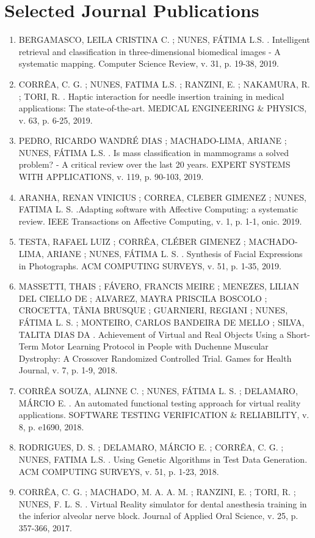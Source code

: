 \documentclass[11pt,a4paper,sans]{moderncv} %
\begin{document}
\section{Selected Journal Publications}
\footnotesize
\begin{enumerate}
    \item BERGAMASCO, LEILA CRISTINA C. ; NUNES, FÁTIMA L.S. . Intelligent retrieval and classification in three-dimensional biomedical images - A systematic mapping. Computer Science Review, v. 31, p. 19-38, 2019.
    \item CORRÊA, C. G. ; NUNES, FATIMA L.S. ; RANZINI, E. ; NAKAMURA, R. ; TORI, R. . Haptic interaction for needle insertion training in medical applications: The state-of-the-art. MEDICAL ENGINEERING \& PHYSICS, v. 63, p. 6-25, 2019.
    \item PEDRO, RICARDO WANDRÉ DIAS ; MACHADO-LIMA, ARIANE ; NUNES, FÁTIMA L.S. . Is mass classification in mammograms a solved problem? - A critical review over the last 20 years. EXPERT SYSTEMS WITH APPLICATIONS, v. 119, p. 90-103, 2019.
    \item ARANHA, RENAN VINICIUS ; CORREA, CLEBER GIMENEZ ; NUNES, FATIMA L. S. .Adapting software with Affective Computing: a systematic review. IEEE Transactions on Affective Computing, v. 1, p. 1-1, onic. 2019.
    \item TESTA, RAFAEL LUIZ ; CORRÊA, CLÉBER GIMENEZ ; MACHADO-LIMA, ARIANE ; NUNES, FÁTIMA L. S. . Synthesis of Facial Expressions in Photographs. ACM COMPUTING SURVEYS, v. 51, p. 1-35, 2019.
    \item MASSETTI, THAIS ; FÁVERO, FRANCIS MEIRE ; MENEZES, LILIAN DEL CIELLO DE ; ALVAREZ, MAYRA PRISCILA BOSCOLO ; CROCETTA, TÂNIA BRUSQUE ; GUARNIERI, REGIANI ; NUNES, FÁTIMA L. S. ; MONTEIRO, CARLOS BANDEIRA DE MELLO ; SILVA, TALITA DIAS DA . Achievement of Virtual and Real Objects Using a Short-Term Motor Learning Protocol in People with Duchenne Muscular Dystrophy: A Crossover Randomized Controlled Trial. Games for Health Journal, v. 7, p. 1-9, 2018.
    \item CORRÊA SOUZA, ALINNE C. ; NUNES, FÁTIMA L. S. ; DELAMARO, MÁRCIO E. . An automated functional testing approach for virtual reality applications. SOFTWARE TESTING VERIFICATION \& RELIABILITY, v. 8, p. e1690, 2018.
    \item RODRIGUES, D. S. ; DELAMARO, MÁRCIO E. ; CORRÊA, C. G. ; NUNES, FATIMA L.S. . Using Genetic Algorithms in Test Data Generation. ACM COMPUTING SURVEYS, v. 51, p. 1-23, 2018.
    \item CORRÊA, C. G. ; MACHADO, M. A. A. M. ; RANZINI, E. ; TORI, R. ; NUNES, F. L. S. . Virtual Reality simulator for dental anesthesia training in the inferior alveolar nerve block. Journal of Applied Oral Science, v. 25, p. 357-366, 2017.

\end{enumerate}
\end{document}
